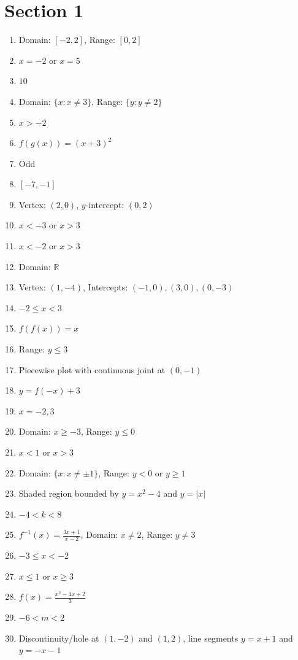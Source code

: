 \documentclass[11pt,a4paper]{article}
\begin{document}
\section*{Section 1}
\begin{enumerate}
    \item Domain: $[-2, 2]$, Range: $[0, 2]$
    \item $x = -2$ or $x = 5$
    \item $10$
    \item Domain: $\{x: x \neq 3\}$, Range: $\{y: y \neq 2\}$
    \item $x > -2$
    \item $f(g(x)) = (x+3)^2$
    \item Odd
    \item $[-7, -1]$
    \item Vertex: $(2,0)$, $y$-intercept: $(0,2)$
    \item $x < -3$ or $x > 3$
    \item $x < -2$ or $x > 3$
    \item Domain: $\mathbb{R}$
    \item Vertex: $(1,-4)$, Intercepts: $(-1,0), (3,0), (0,-3)$
    \item $-2 \le x < 3$
    \item $f(f(x)) = x$
    \item Range: $y \le 3$
    \item Piecewise plot with continuous joint at $(0,-1)$
    \item $y = f(-x) + 3$
    \item $x = -2, 3$
    \item Domain: $x \ge -3$, Range: $y \le 0$
    \item $x < 1$ or $x > 3$
    \item Domain: $\{x: x \neq \pm 1\}$, Range: $y < 0$ or $y \ge 1$
    \item Shaded region bounded by $y = x^2-4$ and $y = |x|$
    \item $-4 < k < 8$
    \item $f^{-1}(x) = \frac{3x+1}{x-2}$, Domain: $x \neq 2$, Range: $y \neq 3$
    \item $-3 \le x < -2$
    \item $x \le 1$ or $x \ge 3$
    \item $f(x) = \frac{x^2 - 4x + 2}{3}$
    \item $-6 < m < 2$
    \item Discontinuity/hole at $(1,-2)$ and $(1,2)$, line segments $y=x+1$ and $y=-x-1$
\end{enumerate}
\end{document}
